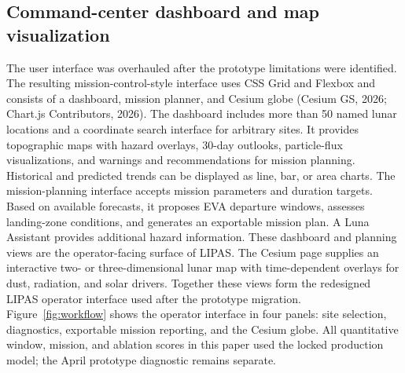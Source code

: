 \subsection{Command-center dashboard and map visualization}

The user interface was overhauled after the prototype limitations were identified. The resulting mission-control-style interface uses CSS Grid and Flexbox and consists of a dashboard, mission planner, and Cesium globe (Cesium GS, 2026; Chart.js Contributors, 2026). The dashboard includes more than 50 named lunar locations and a coordinate search interface for arbitrary sites. It provides topographic maps with hazard overlays, 30-day outlooks, particle-flux visualizations, and warnings and recommendations for mission planning. Historical and predicted trends can be displayed as line, bar, or area charts. The mission-planning interface accepts mission parameters and duration targets. Based on available forecasts, it proposes EVA departure windows, assesses landing-zone conditions, and generates an exportable mission plan. A Luna Assistant provides additional hazard information. These dashboard and planning views are the operator-facing surface of LIPAS. The Cesium page supplies an interactive two- or three-dimensional lunar map with time-dependent overlays for dust, radiation, and solar drivers. Together these views form the redesigned LIPAS operator interface used after the prototype migration. Figure~\ref{fig:workflow} shows the operator interface in four panels: site selection, diagnostics, exportable mission reporting, and the Cesium globe. All quantitative window, mission, and ablation scores in this paper used the locked production model; the April prototype diagnostic remains separate.

